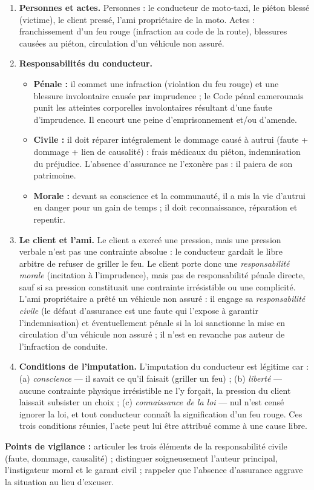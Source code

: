 \documentclass[11pt]{article}
\begin{document}
\begin{corrige}
\begin{enumerate}
\item \textbf{Personnes et actes.} Personnes : le conducteur de moto-taxi, le piéton blessé (victime), le client pressé, l'ami propriétaire de la moto. Actes : franchissement d'un feu rouge (infraction au code de la route), blessures causées au piéton, circulation d'un véhicule non assuré.
\item \textbf{Responsabilités du conducteur.}
\begin{itemize}
\item \textbf{Pénale :} il commet une infraction (violation du feu rouge) et une blessure involontaire causée par imprudence ; le Code pénal camerounais punit les atteintes corporelles involontaires résultant d'une faute d'imprudence. Il encourt une peine d'emprisonnement et/ou d'amende.
\item \textbf{Civile :} il doit réparer intégralement le dommage causé à autrui (faute + dommage + lien de causalité) : frais médicaux du piéton, indemnisation du préjudice. L'absence d'assurance ne l'exonère pas : il paiera de son patrimoine.
\item \textbf{Morale :} devant sa conscience et la communauté, il a mis la vie d'autrui en danger pour un gain de temps ; il doit reconnaissance, réparation et repentir.
\end{itemize}
\item \textbf{Le client et l'ami.} Le client a exercé une pression, mais une pression verbale n'est pas une contrainte absolue : le conducteur gardait le libre arbitre de refuser de griller le feu. Le client porte donc une \emph{responsabilité morale} (incitation à l'imprudence), mais pas de responsabilité pénale directe, sauf si sa pression constituait une contrainte irrésistible ou une complicité. L'ami propriétaire a prêté un véhicule non assuré : il engage sa \emph{responsabilité civile} (le défaut d'assurance est une faute qui l'expose à garantir l'indemnisation) et éventuellement pénale si la loi sanctionne la mise en circulation d'un véhicule non assuré ; il n'est en revanche pas auteur de l'infraction de conduite.
\item \textbf{Conditions de l'imputation.} L'imputation du conducteur est légitime car : (a) \emph{conscience} — il savait ce qu'il faisait (griller un feu) ; (b) \emph{liberté} — aucune contrainte physique irrésistible ne l'y forçait, la pression du client laissait subsister un choix ; (c) \emph{connaissance de la loi} — nul n'est censé ignorer la loi, et tout conducteur connaît la signification d'un feu rouge. Ces trois conditions réunies, l'acte peut lui être attribué comme à une cause libre.
\end{enumerate}
\textbf{Points de vigilance :} articuler les trois éléments de la responsabilité civile (faute, dommage, causalité) ; distinguer soigneusement l'auteur principal, l'instigateur moral et le garant civil ; rappeler que l'absence d'assurance aggrave la situation au lieu d'excuser.
\end{corrige}
\end{document}

